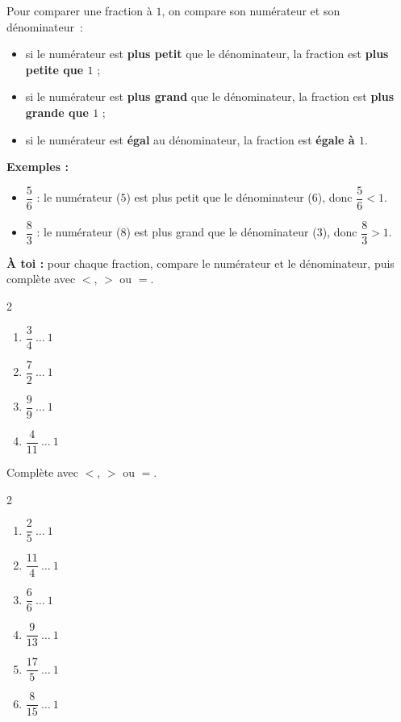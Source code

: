 \documentclass[11pt]{article}
\begin{document}
\begin{exercice}
Pour comparer une fraction à $1$, on compare son numérateur et son dénominateur~:
\begin{itemize}[itemsep=.3em]
\item si le numérateur est \textbf{plus petit} que le dénominateur, la fraction est \textbf{plus petite que $1$} ;
\item si le numérateur est \textbf{plus grand} que le dénominateur, la fraction est \textbf{plus grande que $1$} ;
\item si le numérateur est \textbf{égal} au dénominateur, la fraction est \textbf{égale à $1$}.
\end{itemize}

\textbf{Exemples :}
\begin{itemize}[itemsep=.3em]
\item $\dfrac{5}{6}$ : le numérateur ($5$) est plus petit que le dénominateur ($6$), donc $\dfrac{5}{6} < 1$.
\item $\dfrac{8}{3}$ : le numérateur ($8$) est plus grand que le dénominateur ($3$), donc $\dfrac{8}{3} > 1$.
\end{itemize}

\vspace{.5em}
\textbf{À toi :} pour chaque fraction, compare le numérateur et le dénominateur, puis complète avec $<$, $>$ ou $=$.
\begin{multicols}{2}
\begin{enumerate}[itemsep=1em]
\item $\dfrac{3}{4} \ \ldots \ 1$ \dotfill
\item $\dfrac{7}{2} \ \ldots \ 1$ \dotfill
\item $\dfrac{9}{9} \ \ldots \ 1$ \dotfill
\item $\dfrac{4}{11} \ \ldots \ 1$ \dotfill
\end{enumerate}
\end{multicols}
\end{exercice}

\begin{exercice}
Complète avec $<$, $>$ ou $=$.
\begin{multicols}{2}
\begin{enumerate}[itemsep=1em]
\item $\dfrac{2}{5} \ \ldots \ 1$
\item $\dfrac{11}{4} \ \ldots \ 1$
\item $\dfrac{6}{6} \ \ldots \ 1$
\item $\dfrac{9}{13} \ \ldots \ 1$
\item $\dfrac{17}{5} \ \ldots \ 1$
\item $\dfrac{8}{15} \ \ldots \ 1$
\end{enumerate}
\end{multicols}
\end{exercice}
\end{document}
